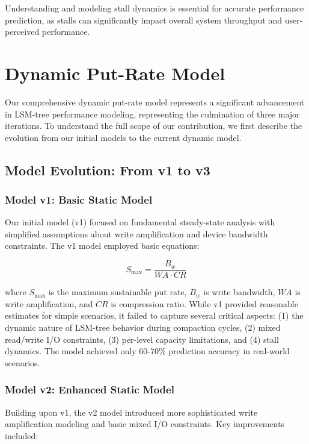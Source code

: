 \documentclass[11pt]{article}
\begin{document}
Understanding and modeling stall dynamics is essential for accurate performance prediction, as stalls can significantly impact overall system throughput and user-perceived performance.

\section{Dynamic Put-Rate Model}
\label{sec:dynamic_model}

Our comprehensive dynamic put-rate model represents a significant advancement in LSM-tree performance modeling, representing the culmination of three major iterations. To understand the full scope of our contribution, we first describe the evolution from our initial models to the current dynamic model.

\subsection{Model Evolution: From v1 to v3}

\subsubsection{Model v1: Basic Static Model}
Our initial model (v1) focused on fundamental steady-state analysis with simplified assumptions about write amplification and device bandwidth constraints. The v1 model employed basic equations:

\begin{equation}
S_{\text{max}} = \frac{B_w}{WA \cdot CR}
\end{equation}

where $S_{\text{max}}$ is the maximum sustainable put rate, $B_w$ is write bandwidth, $WA$ is write amplification, and $CR$ is compression ratio. While v1 provided reasonable estimates for simple scenarios, it failed to capture several critical aspects: (1) the dynamic nature of LSM-tree behavior during compaction cycles, (2) mixed read/write I/O constraints, (3) per-level capacity limitations, and (4) stall dynamics. The model achieved only 60-70\% prediction accuracy in real-world scenarios.

\subsubsection{Model v2: Enhanced Static Model}
Building upon v1, the v2 model introduced more sophisticated write amplification modeling and basic mixed I/O constraints. Key improvements included:
\end{document}
